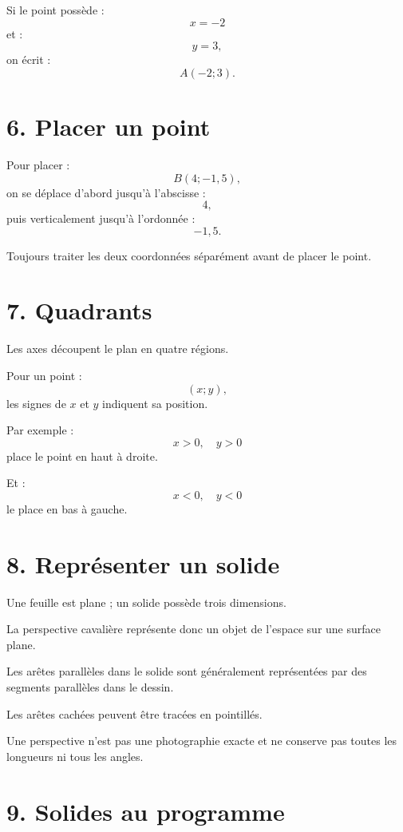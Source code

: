 Si le point possède :
\[
x=-2
\]
et :
\[
y=3,
\]
on écrit :
\[
\boxed{A(-2;3)}.
\]

\section{6. Placer un point}

Pour placer :
\[
B(4;-1{,}5),
\]
on se déplace d'abord jusqu'à l'abscisse :
\[
4,
\]
puis verticalement jusqu'à l'ordonnée :
\[
-1{,}5.
\]

\begin{methode}
Toujours traiter les deux coordonnées séparément avant de placer le point.
\end{methode}

\section{7. Quadrants}

Les axes découpent le plan en quatre régions.

Pour un point :
\[
(x;y),
\]
les signes de $x$ et $y$ indiquent sa position.

Par exemple :
\[
x>0,\quad y>0
\]
place le point en haut à droite.

Et :
\[
x<0,\quad y<0
\]
le place en bas à gauche.

\section{8. Représenter un solide}

Une feuille est plane ; un solide possède trois dimensions.

La perspective cavalière représente donc un objet de l'espace sur une surface plane.

Les arêtes parallèles dans le solide sont généralement représentées par des segments parallèles dans le dessin.

Les arêtes cachées peuvent être tracées en pointillés.

\begin{attention}
Une perspective n'est pas une photographie exacte et ne conserve pas toutes les longueurs ni tous les angles.
\end{attention}

\section{9. Solides au programme}

